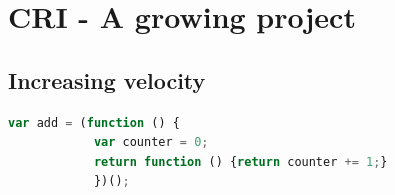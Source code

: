 \section{CRI - A growing project}

	\subsection{Increasing velocity}
		
		\begin{lstlisting}[language=JavaScript, caption={Example of RxJS code.},label={lst:closure}]
			var add = (function () {
			var counter = 0;
			return function () {return counter += 1;}
			})();
		\end{lstlisting}
		
